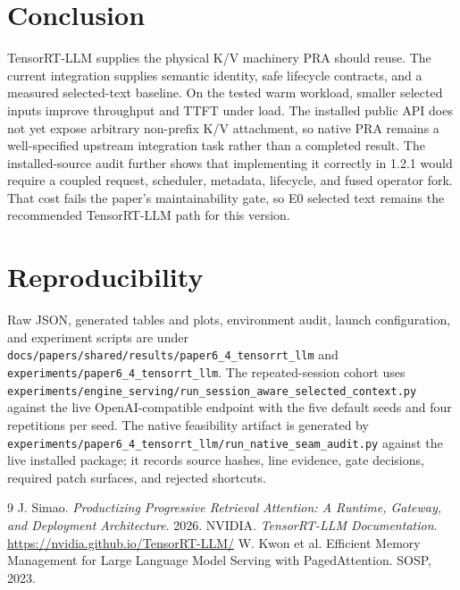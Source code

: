 \documentclass[10pt]{article}
\begin{document}
\section{Conclusion}
TensorRT-LLM supplies the physical K/V machinery PRA should reuse. The current
integration supplies semantic identity, safe lifecycle contracts, and a
measured selected-text baseline. On the tested warm workload, smaller selected
inputs improve throughput and TTFT under load. The installed public API does
not yet expose arbitrary non-prefix K/V attachment, so native PRA remains a
well-specified upstream integration task rather than a completed result. The
installed-source audit further shows that implementing it correctly in 1.2.1
would require a coupled request, scheduler, metadata, lifecycle, and fused
operator fork. That cost fails the paper's maintainability gate, so E0 selected
text remains the recommended TensorRT-LLM path for this version.

\section*{Reproducibility}
Raw JSON, generated tables and plots, environment audit, launch configuration,
and experiment scripts are under
\texttt{docs/papers/shared/results/paper6\_4\_tensorrt\_llm} and
\texttt{experiments/paper6\_4\_tensorrt\_llm}.
The repeated-session cohort uses
\texttt{experiments/engine\_serving/run\_session\_aware\_selected\_context.py}
against the live OpenAI-compatible endpoint with the five default seeds and
four repetitions per seed.
The native feasibility artifact is generated by
\texttt{experiments/paper6\_4\_tensorrt\_llm/run\_native\_seam\_audit.py}
against the live installed package; it records source hashes, line evidence,
gate decisions, required patch surfaces, and rejected shortcuts.

\begin{thebibliography}{9}
J. Simao. \emph{Productizing Progressive Retrieval Attention: A Runtime,
Gateway, and Deployment Architecture}. 2026.
NVIDIA. \emph{TensorRT-LLM Documentation}.\\
\url{https://nvidia.github.io/TensorRT-LLM/}
W. Kwon et al. Efficient Memory Management for Large Language Model Serving
with PagedAttention. SOSP, 2023.
\end{thebibliography}
\end{document}

